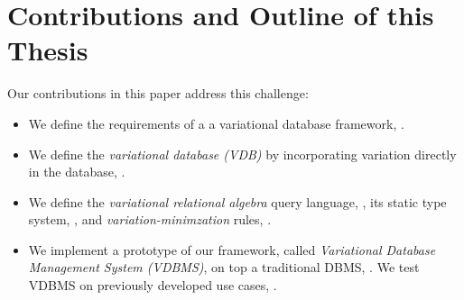 \section{Contributions and Outline of this Thesis}
\label{sec:contribution}


Our contributions in this paper address this challenge:
\begin{itemize}
\item We define the requirements of a a variational database framework, .
\item We define the \emph{variational database (VDB)} by incorporating 
variation directly in the database, .
\item We define the 
\emph{variational relational algebra} query language, , 
its static type system, ,
and \emph{variation-minimzation} rules, .
\item 
We implement a prototype of our framework, called  \emph{Variational Database Management System (VDBMS)}, on top a traditional DBMS, .
We test VDBMS on previously developed use cases, .
\end{itemize}